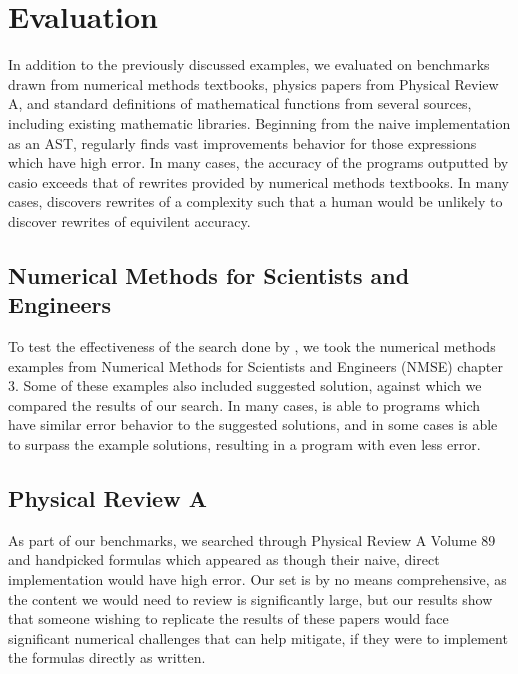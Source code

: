 \documentclass[paper.tex]{subfiles}
\begin{document}
\section{Evaluation}


In addition to the previously discussed examples,
we evaluated \casio on benchmarks drawn from
numerical methods textbooks,
physics papers from Physical Review A,
and standard definitions of mathematical functions from several sources,
including existing mathematic libraries.
Beginning from the naive implementation as an AST,
\casio regularly finds vast improvements behavior for those expressions which have high error.
In many cases, the accuracy of the programs outputted by casio 
exceeds that of rewrites provided by numerical methods textbooks.
In many cases, \casio discovers rewrites of a complexity 
such that a human would be unlikely to discover rewrites of equivilent accuracy.

\subsection{Numerical Methods for Scientists and Engineers}

To test the effectiveness of the search done by \casio,
we took the numerical methods examples from
Numerical Methods for Scientists and Engineers (NMSE) chapter 3.
Some of these examples also included suggested solution,
against which we compared the results of our search.
In many cases, \casio is able to programs which have
similar error behavior to the suggested solutions,
and in some cases \casio is able to surpass the
example solutions, resulting in a program with even less error.

\subsection{Physical Review A}

As part of our benchmarks, we searched through Physical Review A Volume 89
and handpicked formulas which appeared as though
their naive, direct implementation would have high error.
Our set is by no means comprehensive,
as the content we would need to review is significantly large,
but our results show that someone wishing to replicate the results of these papers
would face significant numerical challenges that \casio can help mitigate,
if they were to implement the formulas directly as written.
\end{document}
